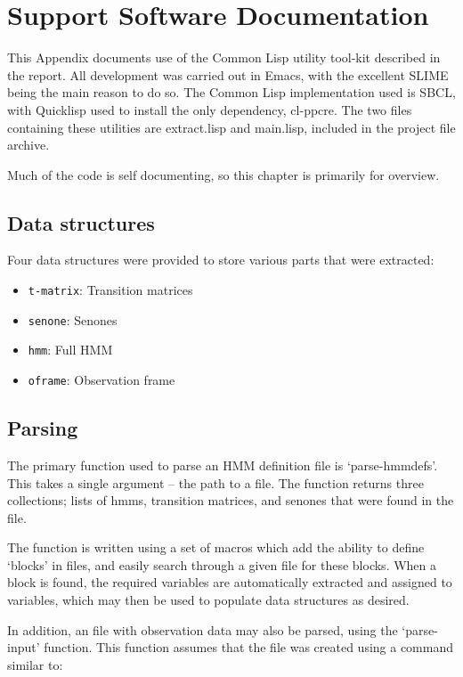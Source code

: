 \chapter{Support Software Documentation} %
\label{apdx:lisp_utils}

This Appendix documents use of the Common Lisp utility tool-kit described in the report.  All development was carried out in Emacs, with the excellent SLIME being the main reason to do so.  The Common Lisp implementation used is SBCL, with Quicklisp used to install the only dependency, cl-ppcre.  The two files containing these utilities are extract.lisp and main.lisp, included in the project file archive.

Much of the code is self documenting, so this chapter is primarily for overview.

\section{Data structures} %
\label{apdx:data_structures}
	Four data structures were provided to store various parts that were extracted:
	\begin{itemize}
		\item \texttt{t-matrix}: Transition matrices
		\item \texttt{senone}: Senones
		\item \texttt{hmm}: Full HMM
		\item \texttt{oframe}: Observation frame
	\end{itemize}


\section{Parsing} %
\label{apdx:hmm_parsing}
	The primary function used to parse an HMM definition file is `parse-hmmdefs'.  This takes a single argument -- the path to a file.  The function returns three collections; lists of hmms, transition matrices, and senones that were found in the file.

	The function is written using a set of macros which add the ability to define `blocks' in files, and easily search through a given file for these blocks.  When a block is found, the required variables are automatically extracted and assigned to variables, which may then be used to populate data structures as desired.

	In addition, an file with observation data may also be parsed, using the `parse-input' function.  This function assumes that the file was created using a command similar to: 

